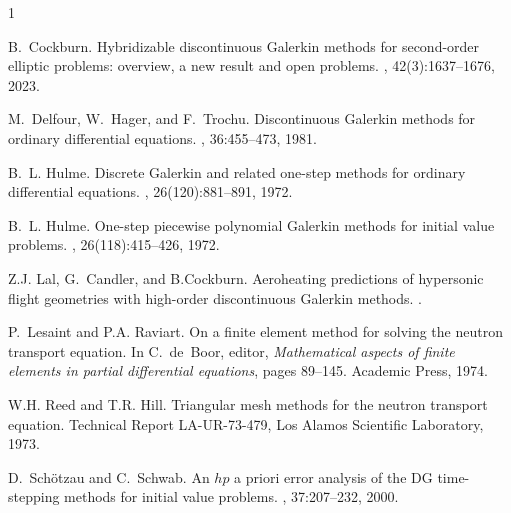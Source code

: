\documentclass[bpam,reqno]{ipart}
\begin{document}
\begin{thebibliography}{1}

B.~Cockburn.
\newblock Hybridizable discontinuous {G}alerkin methods for second-order elliptic problems: overview, a new result and open problems.
, 42(3):1637--1676, 2023.

M.~Delfour, W.~Hager, and F.~Trochu.
\newblock Discontinuous {G}alerkin methods for ordinary differential equations.
, 36:455--473, 1981.

B.~L. Hulme.
\newblock Discrete {G}alerkin and related one-step methods for ordinary differential equations.
, 26(120):881--891, 1972.

B.~L. Hulme.
\newblock One-step piecewise polynomial {G}alerkin methods for initial value problems.
, 26(118):415--426, 1972.

Z.J. Lal, G.~Candler, and B.Cockburn.
\newblock Aeroheating predictions of hypersonic flight geometries with high-order discontinuous {G}alerkin methods.
.

P.~Lesaint and P.A. Raviart.
\newblock On a finite element method for solving the neutron transport equation.
\newblock In C.~de~Boor, editor, {\em Mathematical aspects of finite elements in partial differential equations}, pages 89--145. Academic Press, 1974.

W.H. Reed and T.R. Hill.
\newblock Triangular mesh methods for the neutron transport equation.
\newblock Technical Report LA-UR-73-479, Los Alamos Scientific Laboratory, 1973.

D.~Sch{\"o}tzau and C.~Schwab.
\newblock An $hp$ a priori error analysis of the {DG} time-stepping methods for initial value problems.
, 37:207--232, 2000.

\end{thebibliography}
\end{document}
